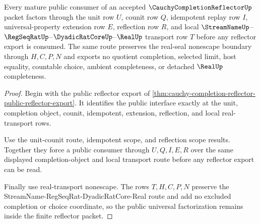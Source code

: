 \begin{theorem}
\label{thm:cauchycompletionreflector-mature-universal-factorization}
Every mature public consumer of an accepted $\CauchyCompletionReflectorUp$ packet factors through the unit row $U$, counit row $Q$, idempotent replay row $I$, universal-property extension row $E$, reflection row $R$, and local $\StreamNameUp$--$\RegSeqRatUp$--$\DyadicRatCoreUp$--$\RealUp$ transport row $T$ before any reflector export is consumed. The same route preserves the real-seal nonescape boundary through $H,C,P,N$ and exports no quotient completion, selected limit, host equality, countable choice, ambient completeness, or detached $\RealUp$ completeness.
\end{theorem}
\begin{proof}
Begin with the public reflector export of \autoref{thm:cauchy-completion-reflector-public-reflector-export}. It identifies the public interface exactly at the unit, completion object, counit, idempotent, extension, reflection, and local real-transport rows.

Use the unit-counit route, idempotent scope, and reflection scope results. Together they force a public consumer through $U,Q,I,E,R$ over the same displayed completion-object and local transport route before any reflector export can be read.

Finally use real-transport nonescape. The rows $T,H,C,P,N$ preserve the StreamName-RegSeqRat-DyadicRatCore-Real route and add no excluded completion or choice coordinate, so the public universal factorization remains inside the finite reflector packet.
\end{proof}

\begin{closurestatus}{\CauchyCompletionReflectorUp}
  \theoryclosure{\matureClosure}
  \formalstatus{\auditCleanV}
\end{closurestatus}

